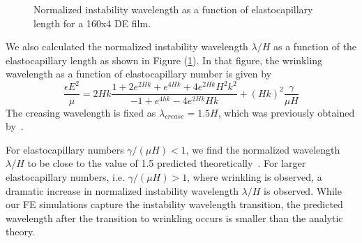 \documentclass[final,authoryear,3p,times]{elsarticle}
\begin{document}

\begin{figure}
\centering
{}
	\caption{Normalized instability wavelength as a function of elastocapillary length for a 160x4 DE film.}
	\label{ecrit1}
\end{figure}

We also calculated the normalized instability wavelength $\lambda/H$ as a function of the elastocapillary length as shown in Figure (\ref{ecrit1}).  In that figure, the wrinkling wavelength as a function of elastocapillary number is given by
\begin{equation} \label{eqn:wrinkle}
\frac{\epsilon E^2}{\mu}=2Hk\frac{1+2e^{2Hk}+e^{4Hk}+4e^{2Hk}H^2k^2}{-1+e^{4hk}-4e^{2Hk}Hk}+\left(Hk\right)^2\frac{\gamma}{\mu H}
\end{equation}
The creasing wavelength is fixed as $\lambda_{crease}=1.5H$, which was previously obtained by~\citet{wangPRE2013}.

For elastocapillary numbers $\gamma/(\mu H)<1$, we find the normalized wavelength $\lambda/H$ to be close to the value of 1.5 predicted theoretically~\cite{wangPRE2013}.  For larger elastocapillary numbers, i.e. $\gamma/(\mu H)>1$, where wrinkling is observed, a dramatic increase in normalized instability wavelength $\lambda/H$ is observed.  While our FE simulations capture the instability wavelength transition, the predicted wavelength after the transition to wrinkling occurs is smaller than the analytic theory.  
\end{document}
